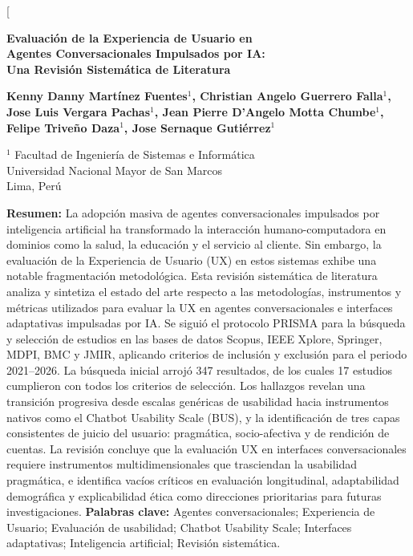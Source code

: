 \documentclass[11pt,twocolumn]{article}
\begin{document}
\twocolumn[
\begin{@twocolumnfalse}
\vspace*{-1cm}
\begin{center}
{\LARGE\bfseries Evaluación de la Experiencia de Usuario en\\[4pt]
Agentes Conversacionales Impulsados por IA:\\[2pt]
Una Revisión Sistemática de Literatura}

\vspace{0.5cm}

{\large\textbf{Kenny Danny Martínez Fuentes$^{1}$, 
Christian Angelo Guerrero Falla$^{1}$, 
Jose Luis Vergara Pachas$^{1}$, 
Jean Pierre D'Angelo Motta Chumbe$^{1}$, 
Felipe Triveño Daza$^{1}$, 
Jose Sernaque Gutiérrez$^{1}$}}

\vspace{0.5cm}

{\small
$^{1}$ Facultad de Ingeniería de Sistemas e Informática\\
Universidad Nacional Mayor de San Marcos\\
Lima, Perú
}
\end{center}
\vspace{0.5cm}

\noindent\textbf{Resumen:} 
La adopción masiva de agentes conversacionales impulsados por inteligencia artificial ha transformado la interacción humano-computadora en dominios como la salud, la educación y el servicio al cliente. Sin embargo, la evaluación de la Experiencia de Usuario (UX) en estos sistemas exhibe una notable fragmentación metodológica. Esta revisión sistemática de literatura analiza y sintetiza el estado del arte respecto a las metodologías, instrumentos y métricas utilizados para evaluar la UX en agentes conversacionales e interfaces adaptativas impulsadas por IA. Se siguió el protocolo PRISMA para la búsqueda y selección de estudios en las bases de datos Scopus, IEEE Xplore, Springer, MDPI, BMC y JMIR, aplicando criterios de inclusión y exclusión para el periodo 2021--2026. La búsqueda inicial arrojó 347 resultados, de los cuales 17 estudios cumplieron con todos los criterios de selección. Los hallazgos revelan una transición progresiva desde escalas genéricas de usabilidad hacia instrumentos nativos como el Chatbot Usability Scale (BUS), y la identificación de tres capas consistentes de juicio del usuario: pragmática, socio-afectiva y de rendición de cuentas. La revisión concluye que la evaluación UX en interfaces conversacionales requiere instrumentos multidimensionales que trasciendan la usabilidad pragmática, e identifica vacíos críticos en evaluación longitudinal, adaptabilidad demográfica y explicabilidad ética como direcciones prioritarias para futuras investigaciones.
\vspace{0.3cm}
\noindent\textbf{Palabras clave:} Agentes conversacionales; Experiencia de Usuario; Evaluación de usabilidad; Chatbot Usability Scale; Interfaces adaptativas; Inteligencia artificial; Revisión sistemática.


\end{@twocolumnfalse}
\end{document}
